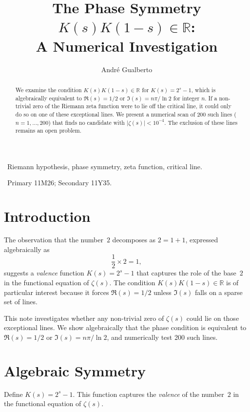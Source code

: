 \documentclass[12pt,a4paper]{article}
\title{The Phase Symmetry $K(s)K(1-s)\in\mathbb{R}$:\\A Numerical Investigation}
\author{Andr\'e Gualberto}
\theoremstyle{plain}
\begin{document}
\maketitle

\begin{abstract}
We examine the condition $K(s)K(1-s)\in\mathbb{R}$ for
$K(s)=2^s-1$, which is algebraically equivalent to
$\Re(s)=1/2$ or $\Im(s)=n\pi/\ln2$ for integer $n$.
If a non-trivial zero of the Riemann zeta function were to
lie off the critical line, it could only do so on one of
these exceptional lines.  We present a numerical scan of
200 such lines ($n=1,\dots,200$) that finds no candidate
with $|\zeta(s)|<10^{-4}$.  The exclusion of these lines
remains an open problem.
\end{abstract}

\ Riemann hypothesis, phase symmetry,
zeta function, critical line.

\ Primary 11M26;
Secondary 11Y35.

\section{Introduction}
\label{sec:intro}

The observation that the number~$2$ decomposes as $2=1+1$, expressed
algebraically as
\[
\frac12 \times 2 = 1,
\]
suggests a {\it valence} function $K(s)=2^s-1$ that captures the
role of the base~$2$ in the functional equation of $\zeta(s)$.
The condition $K(s)K(1-s)\in\mathbb{R}$ is of particular interest
because it forces $\Re(s)=1/2$ unless $\Im(s)$ falls on a sparse
set of lines.

This note investigates whether any non-trivial zero of $\zeta(s)$
could lie on those exceptional lines.  We show algebraically that
the phase condition is equivalent to $\Re(s)=1/2$ or
$\Im(s)=n\pi/\ln2$, and numerically test 200 such lines.

\section{Algebraic Symmetry}
\label{sec:phase}

Define $K(s)=2^s-1$.  This function captures the {\it valence} of
the number~$2$ in the functional equation of $\zeta(s)$.
\end{document}
